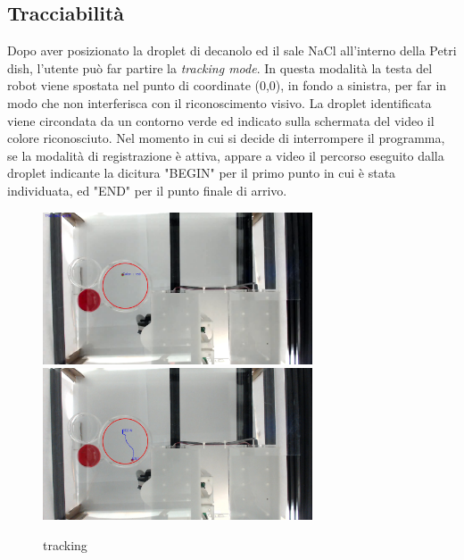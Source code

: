 \subsection{Tracciabilità}
\label{sec:123}
Dopo aver posizionato la droplet di decanolo ed il sale NaCl all'interno della Petri dish, l'utente può far partire la \emph{tracking mode}. In questa modalità la testa del robot viene spostata nel punto di coordinate (0,0), in fondo a sinistra, per far in modo che non interferisca con il riconoscimento visivo. 
La droplet identificata viene circondata da un contorno verde ed indicato sulla schermata del video il colore riconosciuto. Nel momento in cui si decide di interrompere il programma, se la modalità di registrazione è attiva, appare a video il percorso eseguito dalla droplet indicante la dicitura "BEGIN" per il primo punto in cui è stata individuata, ed "END" per il punto finale di arrivo.   
\begin{figure}[h]
	\centering
   		{\includegraphics[width=8cm]{immagini/track.png}}
 	\hspace{2mm}   	
	{\includegraphics[width=8cm]{immagini/track_path.jpg}}
	\caption{tracking}
 	\end{figure}




